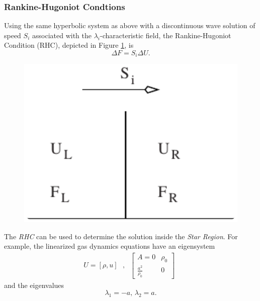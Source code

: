 \documentclass[]{article}
\begin{document}
		\subsubsection{Rankine-Hugoniot Condtions}
			Using the same hyperbolic system as above with a discontinuous wave solution of speed $ S_i $ associated with the $ \lambda_i $-characteristic field, the Rankine-Hugoniot Condition (RHC), depicted in Figure \ref{RankineHugoniot}, is
			\begin{equation}
				\Delta F = S_i \Delta U.
			\end{equation}		
			\begin{figure}[h] 	
				\centering
				\includegraphics[scale=.55]{RankineHugoniot}
				\caption{}
				\label{RankineHugoniot}
			\end{figure}
			The \textit{RHC} can be used to determine the solution inside the \textit{Star Region}. For example, the linearized gas dynamics equations have an eigensystem
			\begin{equation}	
				U = [\rho, u] \mbox{ } \mbox{, }		
				\begin{aligned}
				\left[
					\begin{array}{ll}
						A = 0 & \rho_0\\
						\frac{a^2}{\rho_0} & 0 
					\end{array}
				\right]
				\end{aligned}
			\end{equation}
			and the eigenvalues
			\begin{equation}
				\lambda_1 = -a \mbox{, } \lambda_2 = a.
			\end{equation}
\end{document}
